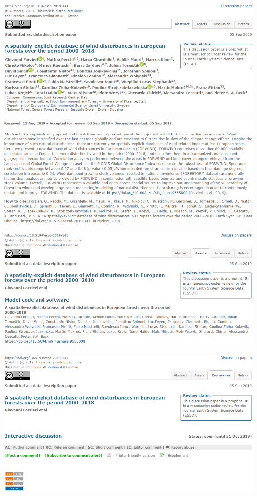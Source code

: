 \documentclass[11pt,oneside]{article}
\begin{document}
\newpage

\begin{flushleft}
\includegraphics[scale=0.7]{Wind_disturbances_titre}
\end{flushleft}

\begin{flushleft}
\includegraphics[scale=0.7]{Wind_disturbances_abstract}
\end{flushleft}

\begin{flushleft}
\includegraphics[scale=0.7]{Wind_disturbances_assets}
\end{flushleft}

\begin{flushleft}
\includegraphics[scale=0.7]{Wind_disturbances_discussion}
\end{flushleft}
\end{document}

